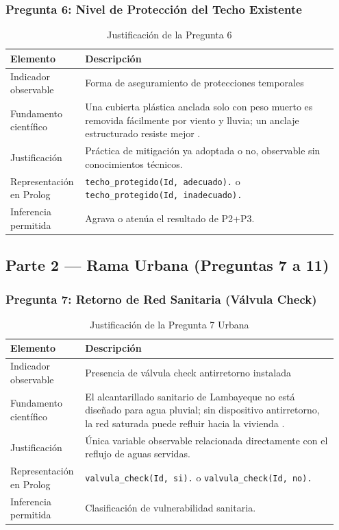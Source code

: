 \documentclass[12pt, letterpaper]{article}
\begin{document}
\subsubsection*{Pregunta 6: Nivel de Protección del Techo Existente}
\begin{table}[H]
\centering
\caption{Justificación de la Pregunta 6}
\label{tab:p6}
\begin{tabular}{@{}p{0.2\linewidth}p{0.75\linewidth}@{}}
\toprule
\textbf{Elemento} & \textbf{Descripción} \\ \midrule
Indicador observable & Forma de aseguramiento de protecciones temporales \\
Fundamento científico & Una cubierta plástica anclada solo con peso muerto es removida fácilmente por viento y lluvia; un anclaje estructurado resiste mejor \parencite{typsa_drenaje}. \\
Justificación & Práctica de mitigación ya adoptada o no, observable sin conocimientos técnicos. \\
Representación en Prolog & \texttt{techo\_protegido(Id, adecuado).} o \texttt{techo\_protegido(Id, inadecuado).} \\
Inferencia permitida & Agrava o atenúa el resultado de P2+P3. \\ \bottomrule
\end{tabular}
\end{table}

\subsection{Parte 2 — Rama Urbana (Preguntas 7 a 11)}

\subsubsection*{Pregunta 7: Retorno de Red Sanitaria (Válvula Check)}
\begin{table}[H]
\centering
\caption{Justificación de la Pregunta 7 Urbana}
\label{tab:p7u}
\begin{tabular}{@{}p{0.2\linewidth}p{0.75\linewidth}@{}}
\toprule
\textbf{Elemento} & \textbf{Descripción} \\ \midrule
Indicador observable & Presencia de válvula check antirretorno instalada \\
Fundamento científico & El alcantarillado sanitario de Lambayeque no está diseñado para agua pluvial; sin dispositivo antirretorno, la red saturada puede refluir hacia la vivienda \parencite{usat_drenaje}. \\
Justificación & Única variable observable relacionada directamente con el reflujo de aguas servidas. \\
Representación en Prolog & \texttt{valvula\_check(Id, si).} o \texttt{valvula\_check(Id, no).} \\
Inferencia permitida & Clasificación de vulnerabilidad sanitaria. \\ \bottomrule
\end{tabular}
\end{table}
\end{document}
